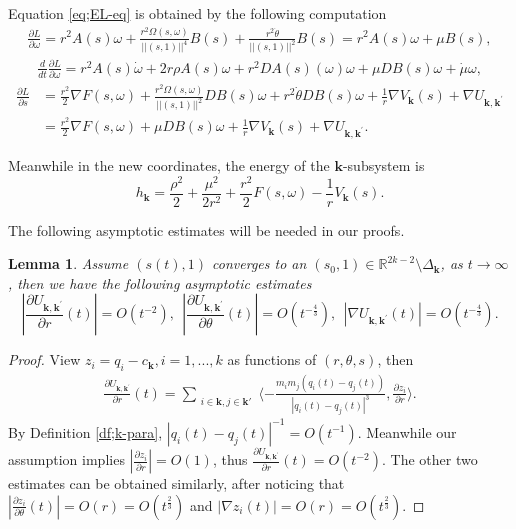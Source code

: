 \documentclass[11pt]{amsart}
\newtheorem{lemma}[theorem]{Lemma}
\theoremstyle{definition}
\theoremstyle{remark}
\numberwithin{equation}{section}
\newcommand{\rr}{\mathbb R}
\newcommand{\bk}{\mathbf k}
\begin{document}
Equation \eqref{eq;EL-eq} is obtained by the following computation
\begin{align*}
    \frac{\partial L}{\partial\omega}=r^2A(s)\omega+\frac{r^2\Omega(s,\omega)}{||(s,1)||^4}B(s)+\frac{r^2\dot{\theta}}{||(s,1)||^2}B(s)=r^2A(s)\omega+\mu B(s),
\end{align*}
\begin{align*}
     \frac{d}{dt}\frac{\partial L}{\partial \omega} =r^2A(s)\dot{\omega}+2r\rho A(s)\omega+r^2DA(s)(\omega)\omega+\mu DB(s)\omega+\dot{\mu}\omega,
\end{align*}
\begin{align*}
    \frac{\partial L}{\partial s}&=\frac{r^2}{2}\nabla F(s,\omega)+\frac{r^2\Omega(s,\omega)}{||(s,1)||^2}DB(s)\omega+r^2\dot{\theta}DB(s)\omega+\frac{1}{r}\nabla V_{\mathbf{k}}(s)+\nabla U_{\mathbf{k},\mathbf{k}^\prime}\\
    &=\frac{r^2}{2}\nabla F(s,\omega)+\mu DB(s)\omega+\frac{1}{r}\nabla V_{\mathbf{k}}(s)+\nabla U_{\mathbf{k},\mathbf{k}^\prime}.
\end{align*}

Meanwhile in the new coordinates, the energy of the $\bk$-subsystem is 
\begin{equation}
\label{eq;eng-eq}
    h_{\mathbf{k}}=\frac{\rho^2}{2}+\frac{\mu^2}{2r^2}+\frac{r^2}{2}F(s,\omega)-\frac{1}{r}V_{\mathbf{k}}(s).
\end{equation}

The following asymptotic estimates will be needed in our proofs. 
\begin{lemma}
\label{lem;est-orbit}
    Assume $(s(t),1)$ converges to an $(s_0, 1) \in \rr^{2k-2} \setminus \Delta_{\bk}$, as $t\rightarrow \infty$, then we have the following asymptotic estimates
    \begin{equation}
    \label{eq;est-para}
         \left| \frac{\partial U_{\mathbf{k},\mathbf{k}^\prime}}{\partial r}(t) \right|=O(t^{-2}),\ \  \left| \frac{\partial U_{\mathbf{k},\mathbf{k}^\prime}}{\partial\theta}(t) \right|=O(t^{-\frac{4}{3}}),\ \ |\nabla U_{\mathbf{k},\mathbf{k}^\prime}(t)|=O(t^{-\frac{4}{3}}).
    \end{equation}  
\end{lemma}
\begin{proof}
View $z_i=q_i-c_{\mathbf{k}},i=1,...,k$ as functions of $(r,\theta,s)$, then
    \begin{align*}
        \frac{\partial U_{\mathbf{k},\mathbf{k}^\prime}}{\partial r}(t)=\sum_{\substack{i \in \bk, j \in \bk'}}\langle-\frac{m_im_j(q_i(t)-q_j(t))}{|q_i(t)-q_j(t)|^3},\frac{\partial z_i}{\partial r}\rangle.
    \end{align*}
By Definition \ref{df;k-para}, $|q_i(t)-q_j(t)|^{-1}=O(t^{-1})$. Meanwhile our assumption implies $|\frac{\partial z_i}{\partial r}|=O(1)$, thus $\frac{\partial U_{\mathbf{k},\mathbf{k}^\prime}}{\partial r}(t)=O(t^{-2})$. The other two estimates can be obtained similarly, after noticing that $|\frac{\partial z_i}{\partial \theta}(t)|=O(r)=O(t^{\frac{2}{3}})$ and $|\nabla z_i(t)|=O(r)=O(t^{\frac{2}{3}})$.
\end{proof}
\end{document}
